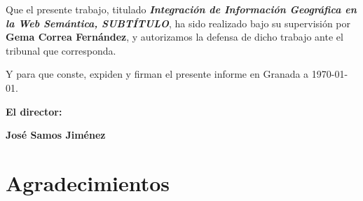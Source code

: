 \vspace{0.5cm}

Que el presente trabajo, titulado \textit{\textbf{Integración de Información Geográfica en la Web Semántica, SUBTÍTULO}},
ha sido realizado bajo su supervisión por \textbf{Gema Correa Fernández}, y autorizamos la defensa de dicho trabajo ante el tribunal que corresponda.

\vspace{0.5cm}

Y para que conste, expiden y firman el presente informe en Granada a \today.

\vspace{1cm}

\textbf{El director:}

\vspace{5cm}

\noindent \textbf{José Samos Jiménez}

\chapter*{Agradecimientos}
\thispagestyle{empty}

       \vspace{1cm}




